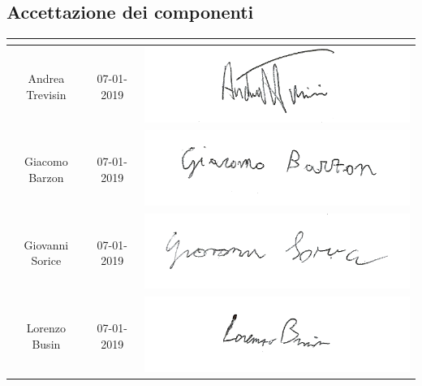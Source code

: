 \subsection{Accettazione dei componenti}
\renewcommand{\arraystretch}{2}
\begin{table}[H]
\begin{center}
  \begin{tabular}{| c | c | c |}
    \hline
    \rowcolor{title_row}
    \textbf{\color{title_text}{Nominativo}} & \textbf{\color{title_text}{Data}} & \textbf{\color{title_text}{Firma}} \\ \hline
    Andrea Trevisin & 07-01-2019 & \includegraphics[align=c,scale=1]{Res/Firme/andrea.png} \\ \hline
    Giacomo Barzon & 07-01-2019 & \includegraphics[align=c,scale=1]{Res/Firme/giacomo.png} \\ \hline
    Giovanni Sorice & 07-01-2019 & \includegraphics[align=c,scale=1]{Res/Firme/ciro.png} \\ \hline
    Lorenzo Busin & 07-01-2019 & \includegraphics[align=c,scale=1]{Res/Firme/lorenzo.png} \\ \hline

\end{tabular}
\end{center}
\end{table}

